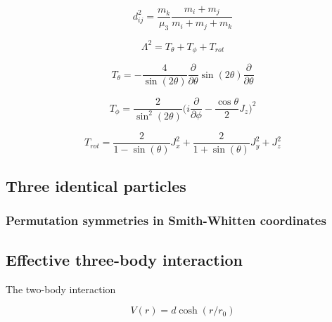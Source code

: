 \documentclass{article}
\begin{document}
\begin{equation}
d_{ij}^{2} =  \frac{m_{k}}{\mu_{3}} \frac{m_{i} + m_{j}}{m_{i} + m_{j} + m_{k}}
\end{equation}

\begin{equation}
\Lambda^2 = T_{\theta} + T_{\phi} + T_{rot}  
\end{equation}

\begin{equation}
T_{\theta} = -\frac{4}{\sin(2\theta)} \frac{\partial}{\partial \theta} \sin(2\theta) \frac{\partial}{\partial \theta}
\end{equation}

\begin{equation}
T_{\phi} = \frac{2}{\sin^2{(2 \theta)}} \Big( i \frac{\partial}{\partial \phi} - \frac{\cos{\theta}}{2} J_{z}\Big)^2  
\end{equation}

\begin{equation}
T_{rot} = \frac{2}{1-\sin(\theta)} J_{x}^{2} + \frac{2}{1+\sin(\theta)} J_{y}^{2} + J_{z}^{2}  
\end{equation}

\subsection{Three identical particles}
\subsubsection{Permutation symmetries in Smith-Whitten coordinates}

\subsection{Effective three-body interaction}
The two-body interaction 

\begin{equation}
V(r) = d\cosh{(r/r_0)}
\end{equation}

\printbibliography
\end{document}

